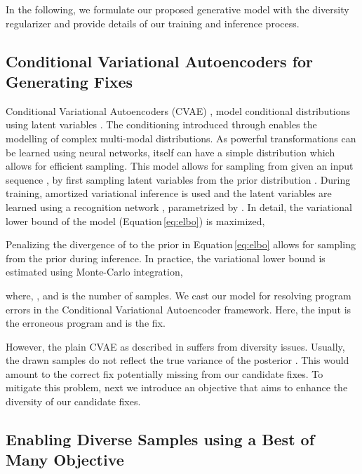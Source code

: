 \documentclass[runningheads]{llncs}
\newcommand{\equref}{Equation}
\begin{document}
In the following, we formulate our proposed generative model with the diversity regularizer and provide details of our training and inference process.  

\subsection{Conditional Variational Autoencoders for Generating Fixes}
Conditional Variational Autoencoders (CVAE) \cite{cvae15sohn}, model conditional distributions  using latent variables  . The conditioning introduced through  enables the modelling of complex multi-modal distributions. As powerful transformations can be learned using neural networks,  itself can have a simple distribution which allows for efficient sampling. This model allows for sampling from  given an input sequence , by first sampling latent variables  from the prior distribution . During training, amortized variational inference is used and the latent variables  are learned using a recognition network , parametrized by .  In detail, the variational lower bound of the model (\equref \,\ref{eq:elbo}) is maximized,


Penalizing the divergence of  to the prior in \equref \,\ref{eq:elbo} allows for sampling from the prior  during inference. In practice, the variational lower bound is estimated using Monte-Carlo integration,


\iffalse

\fi

where, , and  is the number of samples. We cast our model for resolving program errors in the Conditional Variational Autoencoder framework. Here, the input  is the erroneous program and  is the fix. 

However, the plain CVAE as described in \cite{cvae15sohn} suffers from diversity issues. Usually, the drawn samples do not reflect the true variance of the posterior . This would amount to the correct fix potentially missing from our candidate fixes. To mitigate this problem, next we introduce an objective that aims to enhance the diversity of our candidate fixes. 

\subsection{Enabling Diverse Samples using a Best of Many Objective}
\label{subsec:samplefix}
\end{document}
